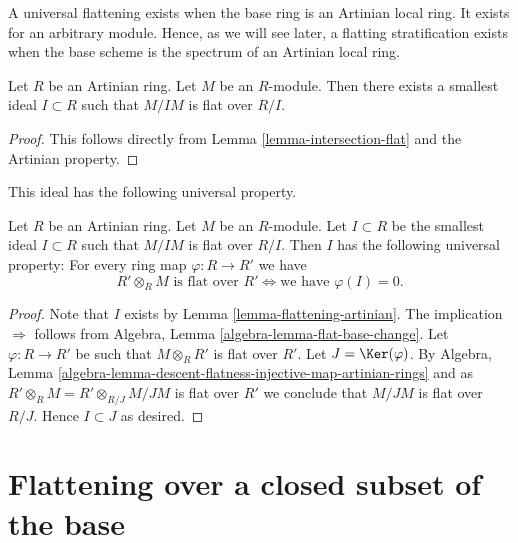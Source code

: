 \noindent
A universal flattening exists when the base ring is an Artinian local
ring. It exists for an arbitrary module. Hence, as we will see later,
a flatting stratification exists when the base scheme is the spectrum
of an Artinian local ring.

\begin{lemma}
\label{lemma-flattening-artinian}
Let $R$ be an Artinian ring.
Let $M$ be an $R$-module.
Then there exists a smallest ideal $I \subset R$ such that
$M/IM$ is flat over $R/I$.
\end{lemma}

\begin{proof}
This follows directly from
Lemma \ref{lemma-intersection-flat}
and the Artinian property.
\end{proof}

\noindent
This ideal has the following universal property.

\begin{lemma}
\label{lemma-flattening-artinian-universal-property}
Let $R$ be an Artinian ring. Let $M$ be an $R$-module.
Let $I \subset R$ be the smallest ideal $I \subset R$ such that
$M/IM$ is flat over $R/I$.
Then $I$ has the following universal property:
For every ring map $\varphi : R \to R'$ we have
$$
R' \otimes_R M\text{ is flat over }R'
\Leftrightarrow
\text{we have }\varphi(I) = 0.
$$
\end{lemma}

\begin{proof}
Note that $I$ exists by
Lemma \ref{lemma-flattening-artinian}.
The implication $\Rightarrow$ follows from
Algebra, Lemma \ref{algebra-lemma-flat-base-change}.
Let $\varphi : R \to R'$ be such that $M \otimes_R R'$ is flat over $R'$.
Let $J = \Ker(\varphi)$. By
Algebra,
Lemma \ref{algebra-lemma-descent-flatness-injective-map-artinian-rings}
and as $R' \otimes_R M = R' \otimes_{R/J} M/JM$ is
flat over $R'$ we conclude that $M/JM$ is flat over $R/J$.
Hence $I \subset J$ as desired.
\end{proof}











\section{Flattening over a closed subset of the base}
\label{section-flattening-local-base}

